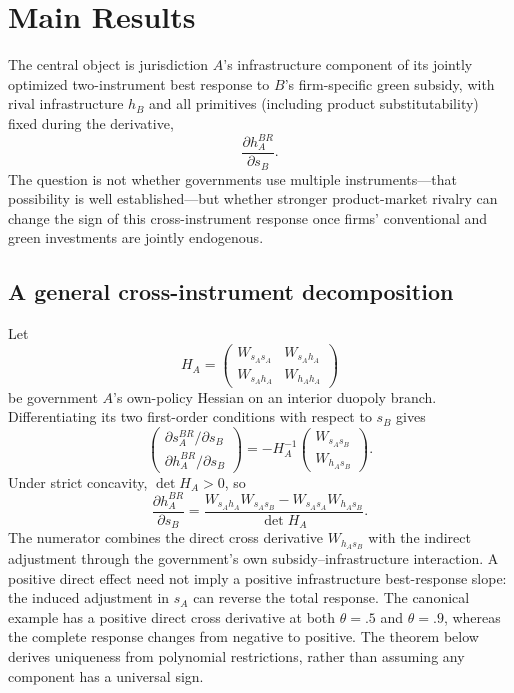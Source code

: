 \section{Main Results}
\label{sec:results}

The central object is jurisdiction $A$'s infrastructure component of its jointly optimized two-instrument best response to $B$'s firm-specific green subsidy, with rival infrastructure $h_B$ and all primitives (including product substitutability) fixed during the derivative,
\[
\frac{\partial h_A^{BR}}{\partial s_B}.
\]
The question is not whether governments use multiple instruments---that possibility is well established---but whether stronger product-market rivalry can change the sign of this cross-instrument response once firms' conventional and green investments are jointly endogenous.

\subsection{A general cross-instrument decomposition}

Let
\[
H_A=
\begin{pmatrix}
W_{s_As_A}&W_{s_Ah_A}\\
W_{s_Ah_A}&W_{h_Ah_A}
\end{pmatrix}
\]
be government $A$'s own-policy Hessian on an interior duopoly branch. Differentiating its two first-order conditions with respect to $s_B$ gives
\begin{equation}
\begin{pmatrix}
\partial s_A^{BR}/\partial s_B\\[2pt]
\partial h_A^{BR}/\partial s_B
\end{pmatrix}
=-H_A^{-1}
\begin{pmatrix}
W_{s_As_B}\\W_{h_As_B}
\end{pmatrix}.
\label{eq:br-ift}
\end{equation}
Under strict concavity, $\det H_A>0$, so
\begin{equation}
\frac{\partial h_A^{BR}}{\partial s_B}
=\frac{W_{s_Ah_A}W_{s_As_B}-W_{s_As_A}W_{h_As_B}}{\det H_A}.
\label{eq:cross-instrument-general}
\end{equation}
The numerator combines the direct cross derivative $W_{h_As_B}$ with the indirect adjustment through the government's own subsidy--infrastructure interaction. A positive direct effect need not imply a positive infrastructure best-response slope: the induced adjustment in $s_A$ can reverse the total response. The canonical example has a positive direct cross derivative at both $\theta=.5$ and $\theta=.9$, whereas the complete response changes from negative to positive. The theorem below derives uniqueness from polynomial restrictions, rather than assuming any component has a universal sign.

